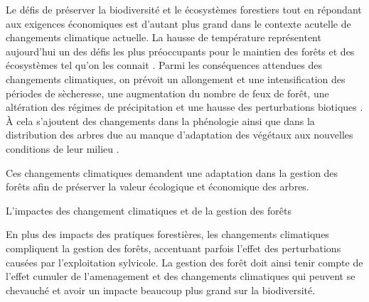 
Le défis de préserver la biodiversité et le écosystèmes forestiers tout en répondant aux exigences économiques est d'autant plus grand dans le contexte acutelle de changements climatique actuelle. 
La hausse de température représentent aujourd'hui un des défis les plus préoccupants pour le maintien des forêts et des écosystèmes tel qu'on les connait \citep{McKenney2009Climatechange,Trumbore2015Foresthealth,Seidl2017Forestdisturbances,Messier2022Warningnatural}.  
Parmi les conséquences attendues des changements climatiques, on prévoit un allongement et une intensification des périodes de sècheresse, une augmentation du nombre de feux de forêt, une altération des régimes de précipitation et une hausse des perturbations biotiques \citep{Parmesan2007Influencesspecies,Joyce2013Climatechange,Gatti2021Amazoniacarbon,Heidari2021Effectsclimate}. 
À cela s'ajoutent des changements dans la phénologie ainsi que dans la distribution des arbres due au manque d'adaptation des végétaux aux nouvelles conditions de leur milieu \citep{Aitken2008Adaptationmigration,Chuine2010Whydoes,Zhu2012Failuremigrate,Gray2013Trackingsuitable}.

Ces changements climatiques demandent une adaptation dans la gestion des forêts afin de préserver la valeur écologique et économique des arbres. 




L'impactes des changement climatiques et de la gestion des forêts 

En plus des impacts des pratiques forestières, les changements climatiques compliquent la gestion des forêts, accentuant parfois l'effet des perturbations causées par l'exploitation sylvicole. 
La gestion des forêt doit ainsi tenir compte de l'effet cumuler de l'amenagement et des changements climatiques qui peuvent se chevauché et avoir un impacte beaucoup plus grand sur la biodiversité.





